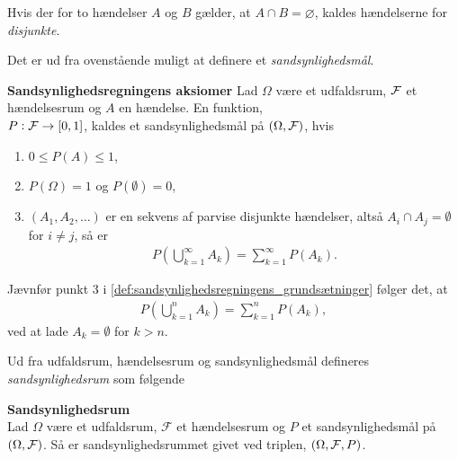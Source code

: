 Hvis der for to hændelser $A$ og $B$ gælder, at $A \cap B = \varnothing$, kaldes hændelserne for \textit{disjunkte}.

Det er ud fra ovenstående muligt at definere et \textit{sandsynlighedsmål}.

\begin{defn}\textbf{Sandsynlighedsregningens aksiomer} \label{def:sandsynlighedsregningens_grundsætninger}%
\newline
Lad $\Omega$ være et udfaldsrum, $\mathcal{F}$ et hændelsesrum og $A$ en hændelse. En funktion,\\ $P: \mathcal{F} \to [0,1]$, kaldes et sandsynlighedsmål på $(\Omega, \mathcal{F})$, hvis
\begin{enumerate}
    \item $0 \leq P(A) \leq 1$,
    \item $P(\Omega) = 1$ og $P(\emptyset)=0$,
    \item $(A_1, A_2, \ldots) $ er en sekvens af parvise disjunkte hændelser, altså $A_i \cap A_j = \emptyset$ for $i \neq j$, så er
    \begin{align*}
        P\left(\bigcup_{k=1}^\infty A_k \right) = \sum_{k=1}^\infty P(A_k).
    \end{align*}
\end{enumerate}
\end{defn}

Jævnfør punkt 3 i \autoref{def:sandsynlighedsregningens_grundsætninger} følger det, at
\begin{align*}
    P\left(\bigcup_{k=1}^n A_k \right) = \sum_{k=1}^n P(A_k),
\end{align*}
ved at lade $A_k = \emptyset$ for $k > n$.

Ud fra udfaldsrum, hændelsesrum og sandsynlighedsmål defineres \textit{sandsynlighedsrum} som følgende

\begin{minipage}\textwidth
\begin{defn}\textbf{Sandsynlighedsrum} \label{def:sandsynlighedsrum}\\
    Lad $\Omega$ være et udfaldsrum, $\mathcal{F}$ et hændelsesrum og $P$ et sandsynlighedsmål på $(\Omega, \mathcal{F})$. Så er sandsynlighedsrummet givet ved triplen, $(\Omega, \mathcal{F}, P)$. 
\end{defn}
\end{minipage}





